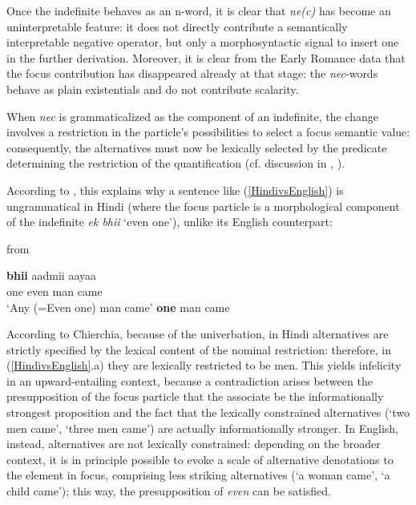 \documentclass[output=paper,modfonts,nonflat,citecolor=brown,
showindex
]{langsci/langscibook}
\begin{document}
Once the indefinite behaves as an n-word, it is clear that {\em{ne(c)}} has become an uninterpretable feature: it does not directly contribute a semantically interpretable negative operator, but only a morphosyntactic signal to insert one in the further derivation. Moreover, it is clear from the Early Romance data that the focus contribution has disappeared already at that stage: the {\em{nec}}-words behave as plain existentials and do not contribute scalarity.

When {\em{nec}} is grammaticalized as the component of an indefinite, the change involves a restriction in the particle's possibilities to select a focus semantic value: consequently, the alternatives must now be lexically selected by the predicate determining the restriction of the quantification (cf. discussion in \citealt[]{Lahiri98}, \citealt[]{Chierchia13}).

According to \citet[156-157]{Chierchia13}, this explains why a sentence like (\ref{HindivsEnglish}) is ungrammatical in Hindi (where the focus particle is a morphological component of the indefinite {\em{ek bhii}} `even one'), unlike its English counterpart:

{\begin{exe}
\ex \label{HindivsEnglish} from \citet[156-157]{Chierchia13}
\begin{xlist}
\ex {} {\bf{bhii}} aadmii aayaa\\ 
one even man came\\
`Any (=Even one) man came'
 {\bf{one}} man came
\end{xlist}
\end{exe}}

\noindent According to Chierchia, because of the univerbation, in Hindi alternatives are strictly specified by the lexical content of the nominal restriction: therefore, in (\ref{HindivsEnglish}.a) they are lexically restricted to be men. This yields infelicity in an upward-entailing context, because a contradiction arises between the presupposition of the focus particle that the associate be the informationally strongest proposition and the fact that the lexically constrained alternatives (`two men came', `three men came') are actually informationally stronger. In English, instead, alternatives are not lexically constrained: depending on the broader context, it is in principle possible to evoke a scale of alternative denotations to the element in focus, comprising less striking alternatives (`a woman came', `a child came'); this way, the presupposition of {\em{even}} can be satisfied.
\end{document}
